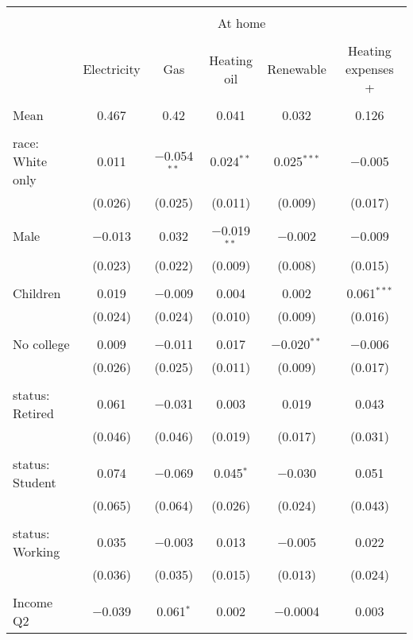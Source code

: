 
\begin{tabular}{@{\extracolsep{5pt}}lccccc} 
\\[-1.8ex]\hline 
\hline \\[-1.8ex] 
 & \multicolumn{5}{c}{At home} \\ 
\cline{2-6} 
\\[-1.8ex] & Electricity & Gas & Heating oil & Renewable & Heating expenses \textdollar 200+ \\ 
\hline \\[-1.8ex] 
 Mean & 0.467 & 0.42 & 0.041 & 0.032 & 0.126  \\ \hline \\[-1.8ex] race: White only & 0.011 & $-$0.054$^{**}$ & 0.024$^{**}$ & 0.025$^{***}$ & $-$0.005 \\ 
  & (0.026) & (0.025) & (0.011) & (0.009) & (0.017) \\ 
  & & & & & \\ 
 Male & $-$0.013 & 0.032 & $-$0.019$^{**}$ & $-$0.002 & $-$0.009 \\ 
  & (0.023) & (0.022) & (0.009) & (0.008) & (0.015) \\ 
  & & & & & \\ 
 Children & 0.019 & $-$0.009 & 0.004 & 0.002 & 0.061$^{***}$ \\ 
  & (0.024) & (0.024) & (0.010) & (0.009) & (0.016) \\ 
  & & & & & \\ 
 No college & 0.009 & $-$0.011 & 0.017 & $-$0.020$^{**}$ & $-$0.006 \\ 
  & (0.026) & (0.025) & (0.011) & (0.009) & (0.017) \\ 
  & & & & & \\ 
 status: Retired & 0.061 & $-$0.031 & 0.003 & 0.019 & 0.043 \\ 
  & (0.046) & (0.046) & (0.019) & (0.017) & (0.031) \\ 
  & & & & & \\ 
 status: Student & 0.074 & $-$0.069 & 0.045$^{*}$ & $-$0.030 & 0.051 \\ 
  & (0.065) & (0.064) & (0.026) & (0.024) & (0.043) \\ 
  & & & & & \\ 
 status: Working & 0.035 & $-$0.003 & 0.013 & $-$0.005 & 0.022 \\ 
  & (0.036) & (0.035) & (0.015) & (0.013) & (0.024) \\ 
  & & & & & \\ 
 Income Q2 & $-$0.039 & 0.061$^{*}$ & 0.002 & $-$0.0004 & 0.003 \\ 

\end{tabular}
